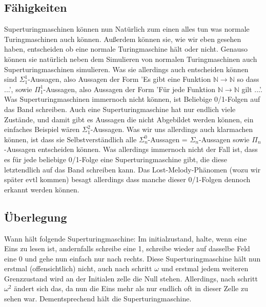 \documentclass{scrartcl}
\begin{document}
\subsection{Fähigkeiten}
Superturingmaschinen können nun Natürlich zum einen alles tun was normale
Turingmaschinen auch können. Außerdem können sie, wie wir eben gesehen haben,
entscheiden ob eine normale Turingmaschine hält oder nicht. Genauso können sie
natürlich neben dem Simulieren von normalen Turingmaschinen auch
Superturingmaschinen simulieren. Was sie allerdings auch entscheiden können
sind $\Sigma_1^1$-Aussagen, also Aussagen der Form 'Es gibt eine Funktion
$\mathbb{N} \rightarrow \mathbb{N}$ so dass ...', sowie $\Pi^1_1$-Aussagen,
also Aussagen der Form 'Für jede Funktion $\mathbb{N} \rightarrow \mathbb{N}$
gilt ...'. Was Superturingmaschinen immernoch nicht können, ist Beliebige
0/1-Folgen auf das Band schreiben. Auch eine Superturingmaschine hat nur
endlich viele Zustände, und damit gibt es Aussagen die nicht Abgebildet
werden können, ein einfaches Beispiel wären $\Sigma_1^2$-Aussagen. Was
wir uns allerdings auch klarmachen können, ist dass sie Selbstverständlich
alle $\Sigma^0_n$-Aussagen = $\Sigma_n$-Aussagen sowie $\Pi_n$-Aussagen
entscheiden können. Was allerdings immernoch nicht der Fall ist, dass es für
jede beliebige 0/1-Folge eine Superturingmaschine gibt, die diese letztendlich
auf das Band schreiben kann. Das Lost-Melody-Phänomen (wozu wir später evtl
kommen) besagt allerdings dass manche dieser 0/1-Folgen dennoch erkannt werden
können.


\subsection{Überlegung}
Wann hält folgende Superturingmaschine: Im initialzustand, halte, wenn eine
Eins zu lesen ist, andernfalls schreibe eine 1, schreibe wieder auf dasselbe
Feld eine 0 und gehe nun einfach nur nach rechts. Diese Superturingmaschine
hält nun erstmal (offensichtlich) nicht, auch nach schritt $\omega$ und erstmal
jedem weiteren Grenzzustand wird an der Initialen zelle die Null stehen.
Allerdings, nach schritt $\omega^2$ ändert sich das, da nun die Eins mehr als
nur endlich oft in dieser Zelle zu sehen war. Dementsprechend hält die
Superturingmaschine.
\end{document}
